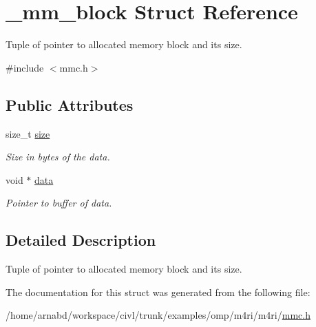 \hypertarget{struct__mm__block}{}\section{\+\_\+mm\+\_\+block Struct Reference}
\label{struct__mm__block}


Tuple of pointer to allocated memory block and it\textquotesingle{}s size.  




{\ttfamily \#include $<$mmc.\+h$>$}

\subsection*{Public Attributes}
\begin{DoxyCompactItemize}
\item 
\hypertarget{struct__mm__block_a6bb094621a88c0d1c0d5525ead5725c2}{}size\+\_\+t \hyperlink{struct__mm__block_a6bb094621a88c0d1c0d5525ead5725c2}{size}\label{struct__mm__block_a6bb094621a88c0d1c0d5525ead5725c2}

\begin{DoxyCompactList}\small\item\em Size in bytes of the data. \end{DoxyCompactList}\item 
\hypertarget{struct__mm__block_ac5d5b177f442d01feb94d84fc7fc9b92}{}void $\ast$ \hyperlink{struct__mm__block_ac5d5b177f442d01feb94d84fc7fc9b92}{data}\label{struct__mm__block_ac5d5b177f442d01feb94d84fc7fc9b92}

\begin{DoxyCompactList}\small\item\em Pointer to buffer of data. \end{DoxyCompactList}\end{DoxyCompactItemize}


\subsection{Detailed Description}
Tuple of pointer to allocated memory block and it\textquotesingle{}s size. 

The documentation for this struct was generated from the following file\+:\begin{DoxyCompactItemize}
\item 
/home/arnabd/workspace/civl/trunk/examples/omp/m4ri/m4ri/\hyperlink{mmc_8h}{mmc.\+h}\end{DoxyCompactItemize}
